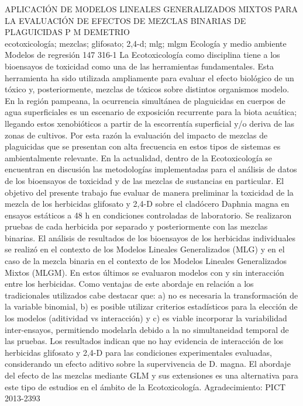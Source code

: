 \A
{APLICACIÓN DE MODELOS LINEALES GENERALIZADOS MIXTOS PARA LA EVALUACIÓN DE EFECTOS DE MEZCLAS BINARIAS DE PLAGUICIDAS}
{P M DEMETRIO}
{
\\
}
{ecotoxicología; mezclas; glifosato; 2,4-d; mlg; mlgm} 
 {Ecología y medio ambiente} 
 {Modelos de regresión} 
 {147} 
 {316-1}
{La Ecotoxicología como disciplina tiene a los bioensayos de toxicidad como una de las herramientas fundamentales. Esta herramienta ha sido utilizada ampliamente para evaluar el efecto biológico de un tóxico y, posteriormente, mezclas de tóxicos sobre distintos organismos modelo. En la región pampeana, la ocurrencia simultánea de plaguicidas en cuerpos de agua superficiales es un escenario de exposición recurrente para la biota acuática; llegando estos xenobióticos a partir de la escorrentía superficial y/o deriva de las zonas de cultivos. Por esta razón la evaluación del impacto de mezclas de plaguicidas que se presentan con alta frecuencia en estos tipos de sistemas es ambientalmente relevante. En la actualidad, dentro de la Ecotoxicología se encuentran en discusión las metodologías implementadas para el análisis de datos de los bioensayos de toxicidad y de las mezclas de sustancias en particular. El objetivo del presente trabajo fue evaluar de manera preliminar la toxicidad de la mezcla de los herbicidas glifosato y 2,4-D sobre el cladócero Daphnia magna en ensayos estáticos a 48 h en condiciones controladas de laboratorio. Se realizaron pruebas de cada herbicida por separado y posteriormente con las mezclas binarias. El análisis de resultados de los bioensayos de los herbicidas individuales se realizó en el contexto de los Modelos Lineales Generalizados (MLG) y en el caso de la mezcla binaria en el contexto de los Modelos Lineales Generalizados Mixtos (MLGM). En estos últimos se evaluaron modelos con y sin interacción entre los herbicidas. Como ventajas de este abordaje en relación a los tradicionales utilizados cabe destacar que: a) no es necesaria la transformación de la variable binomial, b) es posible utilizar criterios estadísticos para la elección de los modelos (aditividad vs interacción) y c) es viable incorporar la variabilidad inter-ensayos, permitiendo modelarla debido a la no simultaneidad temporal de las pruebas. Los resultados indican que no hay evidencia de interacción de los herbicidas glifosato y 2,4-D para las condiciones experimentales evaluadas, considerando un efecto aditivo sobre la supervivencia de D. magna. El abordaje del efecto de las mezclas mediante GLM y sus extensiones es una alternativa para este tipo de estudios en el ámbito de la Ecotoxicología. Agradecimiento: PICT 2013-2393}
